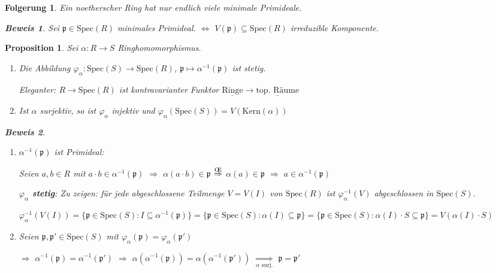 \documentclass[a4paper,12pt]{scrbook}
\theoremstyle{break}
\newtheorem{Prop}[Def]{Proposition}
\newtheorem{Folg}[Def]{Folgerung}
\theoremstyle{nonumberbreak}
\newtheorem{Bew}{Beweis}
\theoremstyle{nonumberplain}
\renewcommand{\OE}{O\!\!E}
\begin{document}
\begin{Folg}
Ein noetherscher Ring hat nur endlich viele minimale Primideale.

\begin{Bew}
Sei $\mathfrak{p} \in \textrm{Spec}(R)$ minimales Primideal. $\Leftrightarrow$ $V(\mathfrak{p}) \subseteq \textrm{Spec}(R)$ irreduzible Komponente.
\end{Bew}
\end{Folg}

\begin{Prop}
Sei $\alpha : R \rightarrow S$ Ringhomomorphismus.

\begin{enumerate}
\item[a)] Die Abbildung $\varphi_\alpha : \textrm{Spec}(S) \rightarrow \textrm{Spec}(R)$, $\mathfrak{p} \mapsto \alpha^{-1}(\mathfrak{p})$ ist stetig.

Eleganter: $R \rightarrow \textrm{Spec}(R)$ ist kontravarianter Funktor $\underline{\textrm{Ringe}} \rightarrow \underline{\textrm{top. Räume}}$

\item[b)] Ist $\alpha$ surjektiv, so ist $\varphi_\alpha$ injektiv und $\varphi_\alpha(\textrm{Spec}(S)) = V(\textrm{Kern}(\alpha))$
\end{enumerate}

\begin{Bew}
\begin{enumerate}
\item[a)] $\alpha^{-1}(\mathfrak{p})$ ist Primideal:

Seien $a,b \in R$ mit $a \cdot b \in \alpha^{-1}(\mathfrak{p})$ $\Rightarrow$ $\alpha(a \cdot b) \in \mathfrak{p}$ $\overset{\text{\OE}}\Rightarrow$ $\alpha(a) \in \mathfrak{p}$ $\Rightarrow$ $a \in \alpha^{-1}(\mathfrak{p})$

\textbf{$\varphi_\alpha$ stetig}: Zu zeigen: für jede abgeschlossene Teilmenge $V = V(I)$ von $\textrm{Spec}(R)$ ist $\varphi_\alpha^{-1}(V)$ abgeschlossen in $\textrm{Spec}(S)$.

$\varphi_\alpha^{-1}(V(I)) = \{ \mathfrak{p} \in \textrm{Spec}(S) : I \subseteq \alpha^{-1}(\mathfrak{p}) \} = \{ \mathfrak{p} \in \textrm{Spec}(S) : \alpha(I) \subseteq \mathfrak{p} \} = \{ \mathfrak{p} \in \textrm{Spec}(S) : \alpha(I) \cdot S \subseteq \mathfrak{p} \} = V(\alpha(I) \cdot S)$

\item[b)]
Seien $\mathfrak{p}, \mathfrak{p'} \in \textrm{Spec}(S)$ mit $\varphi_\alpha(\mathfrak{p}) = \varphi_\alpha(\mathfrak{p'})$

$\Rightarrow$ $\alpha^{-1}(\mathfrak{p}) = \alpha^{-1}(\mathfrak{p'})$
$\Rightarrow$ $\alpha(\alpha^{-1}(\mathfrak{p})) = \alpha(\alpha^{-1}(\mathfrak{p'}))$
$\underset{\alpha \text{ surj.}}\Rightarrow$ $\mathfrak{p} = \mathfrak{p'}$

\end{enumerate}
\end{Bew}
\end{Prop}
\end{document}
